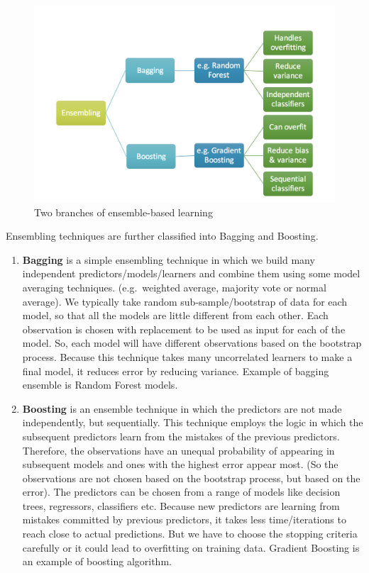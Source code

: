 \documentclass[]{book}
\theoremstyle{definition}
\theoremstyle{definition}
\theoremstyle{definition}
\theoremstyle{remark}
\begin{document}
\begin{figure}

{\centering \includegraphics[width=0.7\linewidth]{figures/ensembling} 

}

\caption{Two branches of ensemble-based learning}\label{fig:ensembling}
\end{figure}

Ensembling techniques are further classified into Bagging and Boosting.

\begin{enumerate}
\def\labelenumi{\arabic{enumi}.}
\item
  \textbf{Bagging} is a simple ensembling technique in which we build
  many independent predictors/models/learners and combine them using
  some model averaging techniques. (e.g.~weighted average, majority vote
  or normal average). We typically take random sub-sample/bootstrap of
  data for each model, so that all the models are little different from
  each other. Each observation is chosen with replacement to be used as
  input for each of the model. So, each model will have different
  observations based on the bootstrap process. Because this technique
  takes many uncorrelated learners to make a final model, it reduces
  error by reducing variance. Example of bagging ensemble is Random
  Forest models.
\item
  \textbf{Boosting} is an ensemble technique in which the predictors are
  not made independently, but sequentially. This technique employs the
  logic in which the subsequent predictors learn from the mistakes of
  the previous predictors. Therefore, the observations have an unequal
  probability of appearing in subsequent models and ones with the
  highest error appear most. (So the observations are not chosen based
  on the bootstrap process, but based on the error). The predictors can
  be chosen from a range of models like decision trees, regressors,
  classifiers etc. Because new predictors are learning from mistakes
  committed by previous predictors, it takes less time/iterations to
  reach close to actual predictions. But we have to choose the stopping
  criteria carefully or it could lead to overfitting on training data.
  Gradient Boosting is an example of boosting algorithm.
\end{enumerate}
\end{document}
